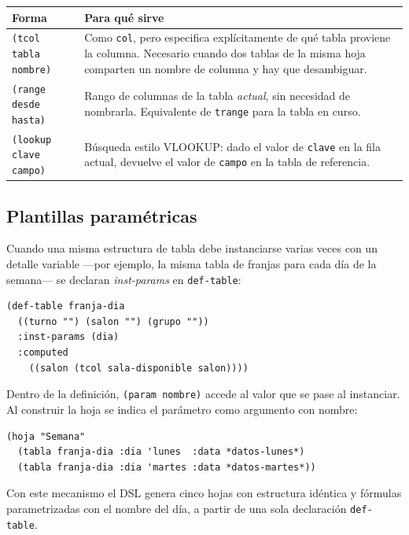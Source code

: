 \documentclass[12pt,a4paper]{report}
\begin{document}
\begin{center}
\begin{tabular}{lp{8cm}}
\toprule
\textbf{Forma} & \textbf{Para qué sirve} \\
\midrule
\texttt{(tcol tabla nombre)} & Como \texttt{col}, pero especifica
  explícitamente de qué tabla proviene la columna.  Necesario cuando dos
  tablas de la misma hoja comparten un nombre de columna y hay que
  desambiguar. \\
\texttt{(range desde hasta)} & Rango de columnas de la tabla \emph{actual},
  sin necesidad de nombrarla.  Equivalente de \texttt{trange} para la tabla
  en curso. \\
\texttt{(lookup clave campo)} & Búsqueda estilo VLOOKUP: dado el valor de
  \texttt{clave} en la fila actual, devuelve el valor de \texttt{campo} en
  la tabla de referencia. \\
\bottomrule
\end{tabular}
\end{center}

\subsection*{Plantillas paramétricas}

Cuando una misma estructura de tabla debe instanciarse varias veces con un
detalle variable ---por ejemplo, la misma tabla de franjas para cada día de
la semana--- se declaran \emph{inst-params} en \texttt{def-table}:

\begin{lstlisting}
(def-table franja-dia
  ((turno "") (salon "") (grupo ""))
  :inst-params (dia)
  :computed
    ((salon (tcol sala-disponible salon))))
\end{lstlisting}

Dentro de la definición, \texttt{(param nombre)} accede al valor que se
pase al instanciar.  Al construir la hoja se indica el parámetro como
argumento con nombre:

\begin{lstlisting}
(hoja "Semana"
  (tabla franja-dia :dia 'lunes  :data *datos-lunes*)
  (tabla franja-dia :dia 'martes :data *datos-martes*))
\end{lstlisting}

Con este mecanismo el DSL genera cinco hojas con estructura idéntica y
fórmulas parametrizadas con el nombre del día, a partir de una sola
declaración \texttt{def-table}.
\end{document}

